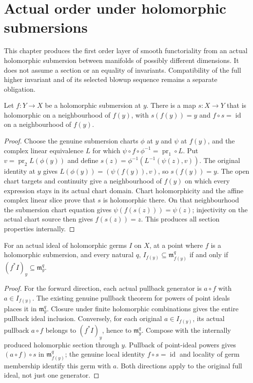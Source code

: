 \section{Actual order under holomorphic submersions}

This chapter produces the first order layer of smooth functoriality from an
actual holomorphic submersion between manifolds of possibly different
dimensions. It does not assume a section or an equality of invariants.
Compatibility of the full higher invariant and of its selected blowup
sequence remains a separate obligation.

\begin{theorem}\label{hir:submersion-local-section}
Let $f:Y\to X$ be a holomorphic submersion at $y$. There is a map
$s:X\to Y$ that is holomorphic on a neighbourhood of $f(y)$, with
$s(f(y))=y$ and $f\circ s=\operatorname{id}$ on a neighbourhood of $f(y)$.
\leanok
\end{theorem}
\begin{proof}
Choose the genuine submersion charts $\phi$ at $y$ and $\psi$ at $f(y)$,
and the complex linear equivalence $L$ for which
$\psi\circ f\circ\phi^{-1}=\operatorname{pr}_1\circ L$.
Put $v=\operatorname{pr}_2 L(\phi(y))$ and define
$s(z)=\phi^{-1}(L^{-1}(\psi(z),v))$.
The original identity at $y$ gives
$L(\phi(y))=(\psi(f(y)),v)$, so $s(f(y))=y$.
The open chart targets and continuity give a neighbourhood of $f(y)$
on which every expression stays in its actual chart domain. Chart
holomorphicity and the affine complex linear slice prove that $s$ is
holomorphic there. On that neighbourhood the submersion chart equation
gives $\psi(f(s(z)))=\psi(z)$; injectivity on the actual chart source
then gives $f(s(z))=z$. This produces all section properties internally.
\end{proof}

\begin{theorem}\label{hir:submersion-order-ge}
For an actual ideal of holomorphic germs $I$ on $X$, at a point where $f$
is a holomorphic submersion, and every natural $q$,
$I_{f(y)}\subseteq\mathfrak m_{f(y)}^q$ if and only if
$(f^*I)_y\subseteq\mathfrak m_y^q$.
\leanok
{}
\end{theorem}
\begin{proof}
For the forward direction, each actual pullback generator is $a\circ f$
with $a\in I_{f(y)}$. The existing genuine pullback theorem for powers
of point ideals places it in $\mathfrak m_y^q$. Closure under finite
holomorphic combinations gives the entire pullback ideal inclusion.
Conversely, for each original $a\in I_{f(y)}$, its actual pullback
$a\circ f$ belongs to $(f^*I)_y$, hence to $\mathfrak m_y^q$.
Compose with the internally produced holomorphic section through $y$.
Pullback of point-ideal powers gives $(a\circ f)\circ s$ in
$\mathfrak m_{f(y)}^q$; the genuine local identity $f\circ s=\operatorname{id}$
and locality of germ membership identify this germ with $a$.
Both directions apply to the original full ideal, not just one generator.
\end{proof}

